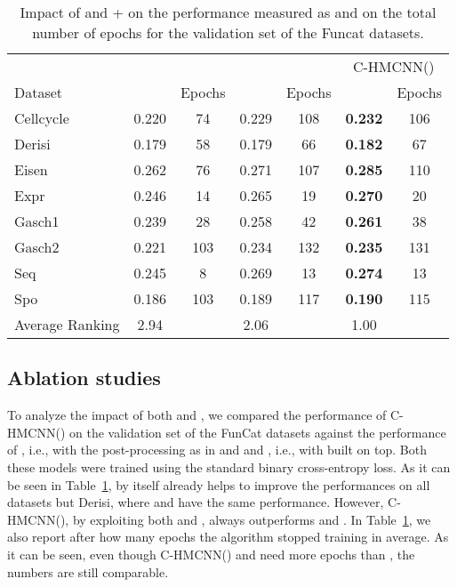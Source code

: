 \documentclass{article}
\newcommand{\module}{\text{MCM}}
\newcommand{\loss}{\text{MCLoss}}
\newcommand{\system}[1]{C-HMCNN(#1)}
\newcommand{\auprc}{}
\begin{document}
\begin{table}[t]
    \centering
        \caption{Impact of  and + on the performance measured as {\auprc} and on the total number of epochs for the validation set of the Funcat datasets.}
    \begin{tabular}{l c c c c c c}
    \toprule
           & \multicolumn{2}{c}{} & \multicolumn{2}{c}{} & \multicolumn{2}{c}{\system{}} \\
         Dataset & \auprc & Epochs & \auprc & Epochs & \auprc & Epochs \\
         \midrule
         {\sc Cellcycle} & 0.220 & 74 & 0.229 & 108 & {\textbf{0.232}} & 106 \\
         {\sc Derisi} & 0.179 & 58 & 0.179 & 66  &  {\textbf{0.182}} & 67\\
         {\sc Eisen} & 0.262 & 76 & 0.271 & 107 & {\textbf{0.285}} & 110 \\
{\sc Expr} & 0.246 & 14 &  0.265 & 19 & {\textbf{0.270}} & 20 \\
         {\sc Gasch1} & 0.239 & 28 & 0.258 & 42 & {\textbf{0.261}} & 38\\
         {\sc Gasch2} & 0.221 & 103 & 0.234 & 132 & {\textbf{0.235}} & 131 \\
         {\sc Seq} & 0.245 & 8 & 0.269 & 13 & {\textbf{0.274}} & 13 \\
         {\sc Spo} & 0.186 & 103 & 0.189 & 117 & {\textbf{0.190}} & 115 \\
         \midrule
         {\sc Average Ranking} & 2.94 & & 2.06 & & 1.00 & \\
    \bottomrule
    \end{tabular}
    \label{tab:ablation}
\end{table}



\subsection{Ablation studies}


To analyze the impact of both  and , we compared the performance of \system{} on the validation set of the FunCat datasets against the performance of  , i.e.,  with the post-processing as in \cite{cerri2016} and \cite{feng2018} and , i.e.,  with  built on top. Both these models were trained using the standard binary cross-entropy loss. 
As it can be seen in Table~\ref{tab:ablation}, \module{} by itself already helps to improve the performances on all datasets but Derisi, where  and  have the same performance. However, \system{}, by exploiting both \module{} and \loss, always outperforms  and . In Table~\ref{tab:ablation}, we also report after how many epochs the algorithm stopped training in average. As it can be seen, even though \system{} and  need more epochs than , the numbers are still comparable. 
\end{document}

